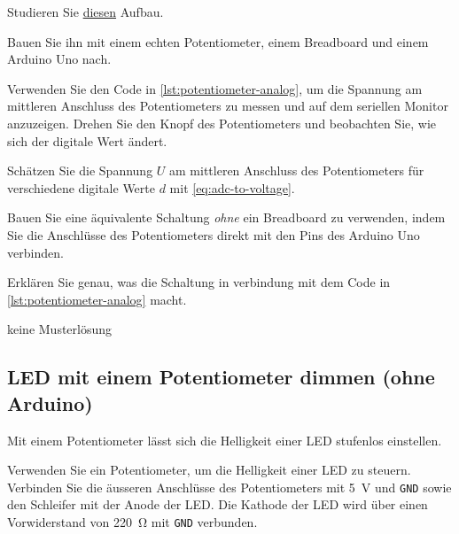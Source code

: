 \clearpage



\begin{myexercise}
Studieren Sie \href{https://www.tinkercad.com/learn/overview/OG8Z4G7L26F9GZ6}{diesen} Aufbau.
\begin{aenum}
    \item Bauen Sie ihn mit einem echten Potentiometer, einem Breadboard und einem Arduino Uno nach.
    \item Verwenden Sie den Code in \cref{lst:potentiometer-analog}, um die Spannung am mittleren Anschluss des Potentiometers zu messen und auf dem seriellen Monitor anzuzeigen. Drehen Sie den Knopf des Potentiometers und beobachten Sie, wie sich der digitale Wert ändert.
    \item Schätzen Sie die Spannung $U$ am mittleren Anschluss des Potentiometers für verschiedene digitale Werte $d$ mit \cref{eq:adc-to-voltage}.
    \item Bauen Sie eine äquivalente Schaltung \emph{ohne} ein Breadboard zu verwenden, indem Sie die Anschlüsse des Potentiometers direkt mit den Pins des Arduino Uno verbinden.
    \item Erklären Sie genau, was die Schaltung in verbindung mit dem Code in \cref{lst:potentiometer-analog} macht.
\end{aenum}
\begin{myanswer}
keine Musterlösung
\end{myanswer} 
\end{myexercise}

\subsection{LED mit einem Potentiometer dimmen (ohne Arduino)}

Mit einem Potentiometer lässt sich die Helligkeit einer LED stufenlos einstellen.

\begin{myexercise}\label{ex:led-dimmer-einfach}
	Verwenden Sie ein Potentiometer, um die Helligkeit einer LED zu steuern. Verbinden Sie die äusseren Anschlüsse des Potentiometers mit \qty{5}{\volt} und \texttt{GND} sowie den Schleifer mit der Anode der LED. Die Kathode der LED wird über einen Vorwiderstand von \qty{220}{\ohm} mit \texttt{GND} verbunden.
\end{myexercise}


